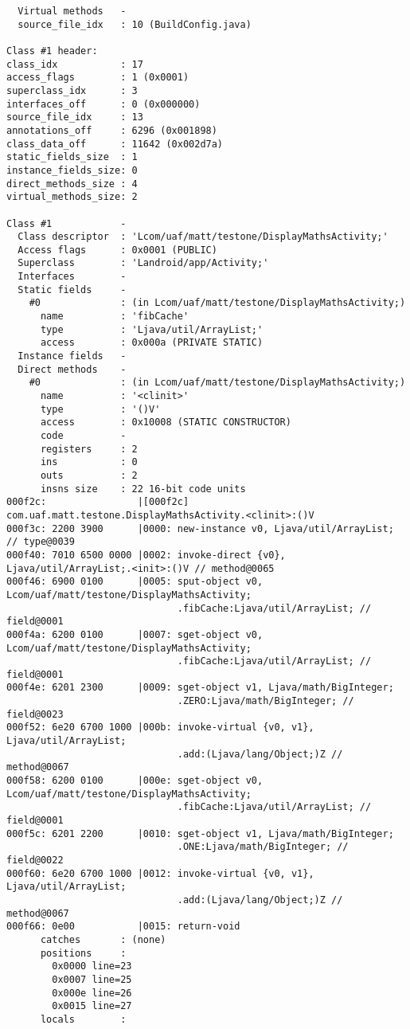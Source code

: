 \begin{lstlisting}
  Virtual methods   -
  source_file_idx   : 10 (BuildConfig.java)

Class #1 header:
class_idx           : 17
access_flags        : 1 (0x0001)
superclass_idx      : 3
interfaces_off      : 0 (0x000000)
source_file_idx     : 13
annotations_off     : 6296 (0x001898)
class_data_off      : 11642 (0x002d7a)
static_fields_size  : 1
instance_fields_size: 0
direct_methods_size : 4
virtual_methods_size: 2

Class #1            -
  Class descriptor  : 'Lcom/uaf/matt/testone/DisplayMathsActivity;'
  Access flags      : 0x0001 (PUBLIC)
  Superclass        : 'Landroid/app/Activity;'
  Interfaces        -
  Static fields     -
    #0              : (in Lcom/uaf/matt/testone/DisplayMathsActivity;)
      name          : 'fibCache'
      type          : 'Ljava/util/ArrayList;'
      access        : 0x000a (PRIVATE STATIC)
  Instance fields   -
  Direct methods    -
    #0              : (in Lcom/uaf/matt/testone/DisplayMathsActivity;)
      name          : '<clinit>'
      type          : '()V'
      access        : 0x10008 (STATIC CONSTRUCTOR)
      code          -
      registers     : 2
      ins           : 0
      outs          : 2
      insns size    : 22 16-bit code units
000f2c:                |[000f2c] com.uaf.matt.testone.DisplayMathsActivity.<clinit>:()V
000f3c: 2200 3900      |0000: new-instance v0, Ljava/util/ArrayList; // type@0039
000f40: 7010 6500 0000 |0002: invoke-direct {v0}, Ljava/util/ArrayList;.<init>:()V // method@0065
000f46: 6900 0100      |0005: sput-object v0, Lcom/uaf/matt/testone/DisplayMathsActivity;
                              .fibCache:Ljava/util/ArrayList; // field@0001
000f4a: 6200 0100      |0007: sget-object v0, Lcom/uaf/matt/testone/DisplayMathsActivity;
                              .fibCache:Ljava/util/ArrayList; // field@0001
000f4e: 6201 2300      |0009: sget-object v1, Ljava/math/BigInteger;
                              .ZERO:Ljava/math/BigInteger; // field@0023
000f52: 6e20 6700 1000 |000b: invoke-virtual {v0, v1}, Ljava/util/ArrayList;
                              .add:(Ljava/lang/Object;)Z // method@0067
000f58: 6200 0100      |000e: sget-object v0, Lcom/uaf/matt/testone/DisplayMathsActivity;
                              .fibCache:Ljava/util/ArrayList; // field@0001
000f5c: 6201 2200      |0010: sget-object v1, Ljava/math/BigInteger;
                              .ONE:Ljava/math/BigInteger; // field@0022
000f60: 6e20 6700 1000 |0012: invoke-virtual {v0, v1}, Ljava/util/ArrayList;
                              .add:(Ljava/lang/Object;)Z // method@0067
000f66: 0e00           |0015: return-void
      catches       : (none)
      positions     :
        0x0000 line=23
        0x0007 line=25
        0x000e line=26
        0x0015 line=27
      locals        :


\end{lstlisting}
